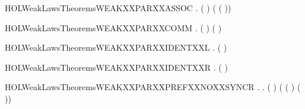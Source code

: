 \newcommand{\HOLWeakLawsTheoremsWEAKXXEXPANSIONXXLAW}{\UseVerbatim{HOLWeakLawsTheoremsWEAKXXEXPANSIONXXLAW}}
\begin{SaveVerbatim}{HOLWeakLawsTheoremsWEAKXXPARXXASSOC}
\HOLTokenTurnstile{} \HOLSymConst{\HOLTokenForall{}}  .  ( \HOLSymConst{\ensuremath{\parallel}}  \HOLSymConst{\ensuremath{\parallel}} ) ( \HOLSymConst{\ensuremath{\parallel}} ( \HOLSymConst{\ensuremath{\parallel}} ))
\end{SaveVerbatim}
\newcommand{\HOLWeakLawsTheoremsWEAKXXPARXXASSOC}{\UseVerbatim{HOLWeakLawsTheoremsWEAKXXPARXXASSOC}}
\begin{SaveVerbatim}{HOLWeakLawsTheoremsWEAKXXPARXXCOMM}
\HOLTokenTurnstile{} \HOLSymConst{\HOLTokenForall{}} .  ( \HOLSymConst{\ensuremath{\parallel}} ) ( \HOLSymConst{\ensuremath{\parallel}} )
\end{SaveVerbatim}
\newcommand{\HOLWeakLawsTheoremsWEAKXXPARXXCOMM}{\UseVerbatim{HOLWeakLawsTheoremsWEAKXXPARXXCOMM}}
\begin{SaveVerbatim}{HOLWeakLawsTheoremsWEAKXXPARXXIDENTXXL}
\HOLTokenTurnstile{} \HOLSymConst{\HOLTokenForall{}}.  ( \HOLSymConst{\ensuremath{\parallel}} ) 
\end{SaveVerbatim}
\newcommand{\HOLWeakLawsTheoremsWEAKXXPARXXIDENTXXL}{\UseVerbatim{HOLWeakLawsTheoremsWEAKXXPARXXIDENTXXL}}
\begin{SaveVerbatim}{HOLWeakLawsTheoremsWEAKXXPARXXIDENTXXR}
\HOLTokenTurnstile{} \HOLSymConst{\HOLTokenForall{}}.  ( \HOLSymConst{\ensuremath{\parallel}} ) 
\end{SaveVerbatim}
\newcommand{\HOLWeakLawsTheoremsWEAKXXPARXXIDENTXXR}{\UseVerbatim{HOLWeakLawsTheoremsWEAKXXPARXXIDENTXXR}}
\begin{SaveVerbatim}{HOLWeakLawsTheoremsWEAKXXPARXXPREFXXNOXXSYNCR}
\HOLTokenTurnstile{} \HOLSymConst{\HOLTokenForall{}} .
        \HOLSymConst{\HOLTokenNotEqual{}}   \HOLSymConst{\HOLTokenImp{}}
       \HOLSymConst{\HOLTokenForall{}} .
            (  \HOLSymConst{\ensuremath{\parallel}}  )
             ( ( \HOLSymConst{\ensuremath{\parallel}}  ) \HOLSymConst{\ensuremath{+}}
               (  \HOLSymConst{\ensuremath{\parallel}} ))
\end{SaveVerbatim}
